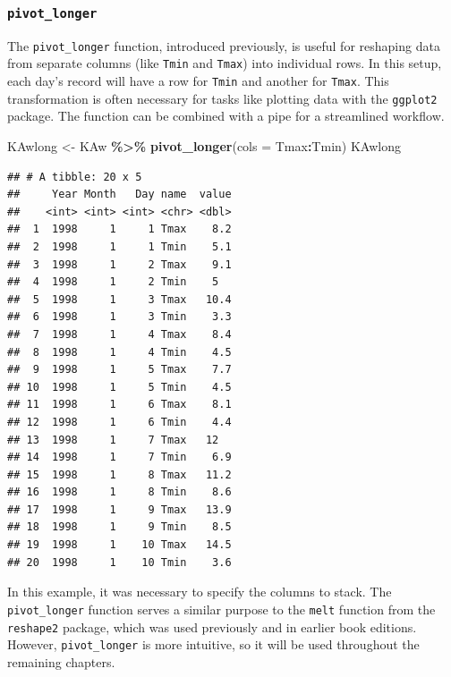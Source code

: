\documentclass[
]{article}
\newenvironment{Shaded}{\begin{snugshade}}{\end{snugshade}}
\newcommand{\AttributeTok}[1]{\textcolor[rgb]{0.13,0.29,0.53}{#1}}
\newcommand{\FunctionTok}[1]{\textcolor[rgb]{0.13,0.29,0.53}{\textbf{#1}}}
\newcommand{\NormalTok}[1]{#1}
\newcommand{\OtherTok}[1]{\textcolor[rgb]{0.56,0.35,0.01}{#1}}
\newcommand{\SpecialCharTok}[1]{\textcolor[rgb]{0.81,0.36,0.00}{\textbf{#1}}}
\begin{document}
\subsubsection{\texorpdfstring{\texttt{pivot\_longer}}{pivot\_longer}}\label{pivot_longer}

The \texttt{pivot\_longer} function, introduced previously, is useful for reshaping data from separate columns (like \texttt{Tmin} and \texttt{Tmax}) into individual rows. In this setup, each day's record will have a row for \texttt{Tmin} and another for \texttt{Tmax}. This transformation is often necessary for tasks like plotting data with the \texttt{ggplot2} package. The function can be combined with a pipe for a streamlined workflow.

\begin{Shaded}
\begin{Highlighting}[]
\NormalTok{KAwlong }\OtherTok{\textless{}{-}}\NormalTok{ KAw }\SpecialCharTok{\%\textgreater{}\%} \FunctionTok{pivot\_longer}\NormalTok{(}\AttributeTok{cols =}\NormalTok{ Tmax}\SpecialCharTok{:}\NormalTok{Tmin)}
\NormalTok{KAwlong}
\end{Highlighting}
\end{Shaded}

\begin{verbatim}
## # A tibble: 20 x 5
##     Year Month   Day name  value
##    <int> <int> <int> <chr> <dbl>
##  1  1998     1     1 Tmax    8.2
##  2  1998     1     1 Tmin    5.1
##  3  1998     1     2 Tmax    9.1
##  4  1998     1     2 Tmin    5  
##  5  1998     1     3 Tmax   10.4
##  6  1998     1     3 Tmin    3.3
##  7  1998     1     4 Tmax    8.4
##  8  1998     1     4 Tmin    4.5
##  9  1998     1     5 Tmax    7.7
## 10  1998     1     5 Tmin    4.5
## 11  1998     1     6 Tmax    8.1
## 12  1998     1     6 Tmin    4.4
## 13  1998     1     7 Tmax   12  
## 14  1998     1     7 Tmin    6.9
## 15  1998     1     8 Tmax   11.2
## 16  1998     1     8 Tmin    8.6
## 17  1998     1     9 Tmax   13.9
## 18  1998     1     9 Tmin    8.5
## 19  1998     1    10 Tmax   14.5
## 20  1998     1    10 Tmin    3.6
\end{verbatim}

In this example, it was necessary to specify the columns to stack. The \texttt{pivot\_longer} function serves a similar purpose to the \texttt{melt} function from the \texttt{reshape2} package, which was used previously and in earlier book editions. However, \texttt{pivot\_longer} is more intuitive, so it will be used throughout the remaining chapters.
\end{document}
